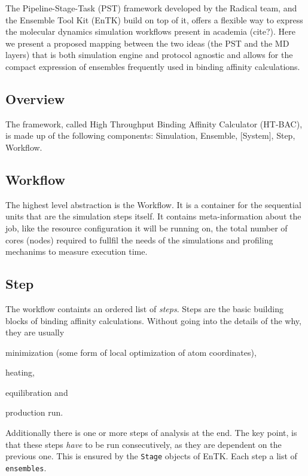 The Pipeline-Stage-Task (PST) framework developed by the Radical team, and the Ensemble Tool Kit (EnTK) build on top of it, offers a flexible way to express the molecular dynamics simulation workflows present in academia (cite?). Here we present a proposed mapping between the two ideas (the PST and the MD layers) that is both simulation engine and protocol agnostic and allows for the compact expression of ensembles frequently used in binding affinity calculations.

\subsection{Overview}

The framework, called High Throughput Binding Affinity Calculator (HT-BAC), is made up of the following components: Simulation, Ensemble, [System], Step, Workflow.%

\subsection{Workflow}

The highest level abstraction is the Workflow. It is a container for the sequential units that are the simulation steps itself. It contains meta-information about the job, like the resource configuration it will be running on, the total number of cores (nodes) required to fullfil the needs of the simulations and profiling mechanims to measure execution time.

\subsection{Step}

The workflow containts an ordered list of \emph{steps}. Steps are the basic building blocks of binding affinity calculations. Without going into the details of the why, they are usually
\begin{enumerate*}[label=(\roman*)]
  \item minimization (some form of local optimization of atom coordinates),
  \item heating,
  \item equilibration and
  \item production run.
\end{enumerate*}
Additionally there is one or more steps of analysis at the end. The key point, is that these steps \emph{have} to be run consecutively, as they are dependent on the previous one. This is ensured by the \texttt{Stage} objects of EnTK. Each step a list of \texttt{ensembles}.

